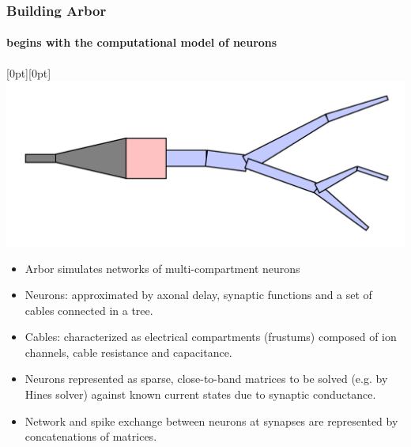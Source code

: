 \documentclass[t]{beamer}
\newcommand{\lenitem}[2][.6\linewidth]{\parbox[t]{#1}{\strut #2\strut}}
\begin{document}
\begin{frame}
    \frametitle{Building Arbor}
    \framesubtitle{begins with the computational model of neurons}

    \mbox{}\hfill\raisebox{-\height}[0pt][0pt]{\includegraphics[width=.35\linewidth]{cell.pdf}}
    \vspace*{-\baselineskip}

    \begin{itemize}
    \item \lenitem{Arbor simulates networks of multi-compartment neurons}
    \item \lenitem{Neurons: approximated by axonal delay, synaptic functions and a set of cables connected in a tree.}
    \item Cables: characterized as electrical compartments (frustums) composed of ion channels, cable resistance and capacitance.
    \item Neurons represented as sparse, close-to-band matrices to be solved (e.g. by Hines solver) against known current states due to synaptic conductance.
    \item Network and spike exchange between neurons at synapses are represented by concatenations of matrices.
    \end{itemize}

\end{frame}
\end{document}
